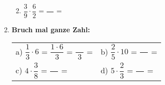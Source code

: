 \begin{enumerate}[label=\arabic*.]
\begin{enumerate}[label=\alph*)]
        \vspace{0.5cm}

        \item $\dfrac{3}{9} \cdot \dfrac{6}{2}$ = $\dfrac{\phantom{00}}{\phantom{00}}$ = \underline{\hspace{3cm}}
    \end{enumerate}

    \vspace{1cm}

    \item \textbf{Bruch mal ganze Zahl:}
    \vspace{0.5cm}

    \begin{tabular}{ll}
        a) $\dfrac{1}{3} \cdot 6$ = $\dfrac{1 \cdot 6}{3}$ = $\dfrac{\phantom{00}}{3}$ = \underline{\hspace{2cm}} & b) $\dfrac{2}{5} \cdot 10$ = $\dfrac{\phantom{00}}{\phantom{00}}$ = \underline{\hspace{2cm}} \\[4ex]
        c) $4 \cdot \dfrac{3}{8}$ = $\dfrac{\phantom{00}}{\phantom{00}}$ = \underline{\hspace{2cm}} & d) $5 \cdot \dfrac{2}{3}$ = $\dfrac{\phantom{00}}{\phantom{00}}$ = \underline{\hspace{2cm}}
    \end{tabular}

\end{enumerate}